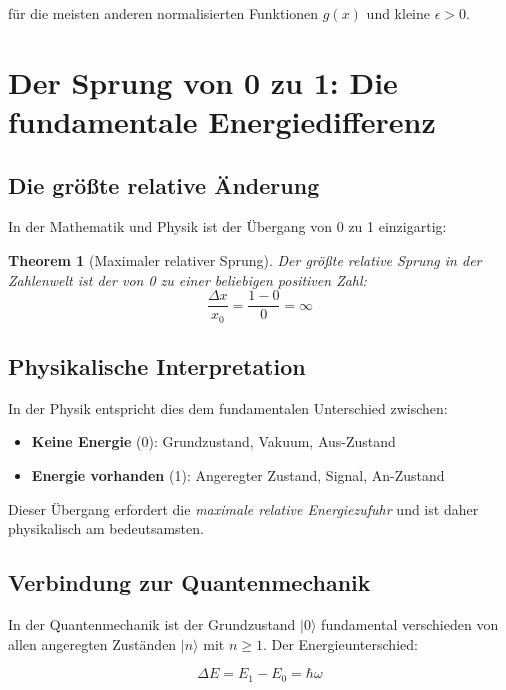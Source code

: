 ﻿\documentclass[12pt,a4paper]{article}
\newtheorem{theorem}{Theorem}[section]
\theoremstyle{definition}
\theoremstyle{remark}
\begin{document}
für die meisten anderen normalisierten Funktionen $g(x)$ und kleine $\epsilon > 0$.

\section{Der Sprung von 0 zu 1: Die fundamentale Energiedifferenz}

\subsection{Die größte relative Änderung}

In der Mathematik und Physik ist der Übergang von 0 zu 1 einzigartig:

\begin{theorem}[Maximaler relativer Sprung]
Der größte relative Sprung in der Zahlenwelt ist der von 0 zu einer beliebigen positiven Zahl:
\begin{equation}
\frac{\Delta x}{x_0} = \frac{1-0}{0} = \infty
\end{equation}
\end{theorem}

\subsection{Physikalische Interpretation}

In der Physik entspricht dies dem fundamentalen Unterschied zwischen:
\begin{itemize}
\item \textbf{Keine Energie} (0): Grundzustand, Vakuum, Aus-Zustand
\item \textbf{Energie vorhanden} (1): Angeregter Zustand, Signal, An-Zustand
\end{itemize}

Dieser Übergang erfordert die \textit{maximale relative Energiezufuhr} und ist daher physikalisch am bedeutsamsten.

\subsection{Verbindung zur Quantenmechanik}

In der Quantenmechanik ist der Grundzustand $|0\rangle$ fundamental verschieden von allen angeregten Zuständen $|n\rangle$ mit $n \geq 1$. Der Energieunterschied:

\begin{equation}
\Delta E = E_1 - E_0 = \hbar \omega
\end{equation}
\end{document}
